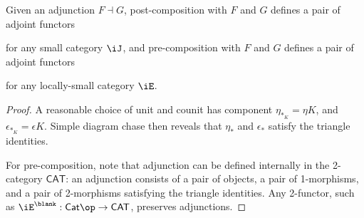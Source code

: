 \documentclass{amsart}
\begin{document}
\begin{lem}
  Given an adjunction $F \dashv G$, post-composition with $F$ and $G$ defines a pair of adjoint functors
  
  for any small category $\iJ$, and pre-composition with $F$ and $G$ defines a pair of adjoint functors
  
  for any locally-small category $\iE$.
\end{lem}
\begin{proof}
  A reasonable choice of unit and counit has component $\eta_{*_{K}} = \eta K$, and $\epsilon_{*_{K}} = \epsilon K$.
  Simple diagram chase then reveals that $\eta_{*}$ and $\epsilon_{*}$ satisfy the triangle identities.

  For pre-composition, note that adjunction can be defined internally in the 2-category $\mathsf{CAT}$: an adjunction consists of a pair of objects, a pair of 1-morphisms, and a pair of 2-morphisms satisfying the triangle identities.
  Any 2-functor, such as $\iE^{\blank} : \mathsf{Cat}\op \to \mathsf{CAT}$, preserves adjunctions.
\end{proof}



\end{document}
